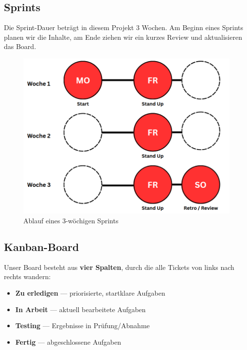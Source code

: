 \documentclass{article}
\begin{document}
\subsection{Sprints}
Die Sprint-Dauer beträgt in diesem Projekt 3 Wochen. Am Beginn eines Sprints planen wir die Inhalte, am Ende ziehen wir ein kurzes Review und aktualisieren das Board.

\begin{figure}[H] 
  \centering
  \includegraphics[width=0.85\linewidth]{Sprint_Zyklus.png}
  \caption{Ablauf eines 3-wöchigen Sprints}
  \label{fig:sprint-ablauf}
\end{figure}

\subsection{Kanban-Board}
Unser Board besteht aus \textbf{vier Spalten}, durch die alle Tickets von links nach rechts wandern:
\begin{itemize}[nosep]
  \item \textbf{Zu erledigen} — priorisierte, startklare Aufgaben
  \item \textbf{In Arbeit} — aktuell bearbeitete Aufgaben
  \item \textbf{Testing} — Ergebnisse in Prüfung/Abnahme
  \item \textbf{Fertig} — abgeschlossene Aufgaben
\end{itemize}
\end{document}
